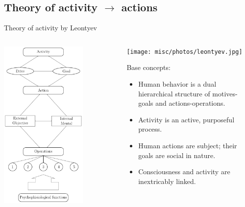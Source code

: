 \documentclass[default]{beamer}
\begin{document}
	\subsection{Theory of activity $\rightarrow$ actions}
	\begin{frame}{Theory of activity by Leontyev}
		\begin{columns}
			\begin{column}{0.4\textwidth}
				\includegraphics[width=0.7\textwidth]{misc/psycho/activity_en.pdf}			
			\end{column}
			\begin{column}{0.6\textwidth}
				\begin{center}
					\texttt{[image: misc/photos/leontyev.jpg]}
				\end{center}
				Base concepts:
				\begin{itemize}
					\item Human behavior is a dual hierarchical structure of motives-goals and actions-operations.
					\item Activity is an active, purposeful process.
					\item Human actions are subject; their goals are social in nature.
					\item Consciousness and activity are inextricably linked.
				\end{itemize}
			\end{column}
		\end{columns}
		\par\bigskip
		\nocite{*}
		\printbibliography[keyword={activity}, resetnumbers=true]
	\end{frame}
\end{document}
